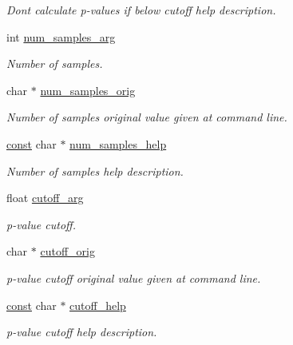 \begin{DoxyCompactItemize}
\begin{DoxyCompactList}\small\item\em Don\textquotesingle{}t calculate p-\/values if below cutoff help description. \end{DoxyCompactList}\item 
int \hyperlink{structgengetopt__args__info_ac62c13305dd12c4d426aeb82b6e4561b}{num\+\_\+samples\+\_\+arg}
\begin{DoxyCompactList}\small\item\em Number of samples. \end{DoxyCompactList}\item 
char $\ast$ \hyperlink{structgengetopt__args__info_a043409e12989cdbf8cd34fa47f8c6a4c}{num\+\_\+samples\+\_\+orig}
\begin{DoxyCompactList}\small\item\em Number of samples original value given at command line. \end{DoxyCompactList}\item 
\hyperlink{getopt_8c_a2c212835823e3c54a8ab6d95c652660e}{const} char $\ast$ \hyperlink{structgengetopt__args__info_a1c4039a0fea549c7db4b2c62482179f8}{num\+\_\+samples\+\_\+help}
\begin{DoxyCompactList}\small\item\em Number of samples help description. \end{DoxyCompactList}\item 
float \hyperlink{structgengetopt__args__info_a79efa24e1a3d614f474d323f147edf10}{cutoff\+\_\+arg}
\begin{DoxyCompactList}\small\item\em p-\/value cutoff. \end{DoxyCompactList}\item 
char $\ast$ \hyperlink{structgengetopt__args__info_ac1cc7e0fbe8552f19e4760b827349622}{cutoff\+\_\+orig}
\begin{DoxyCompactList}\small\item\em p-\/value cutoff original value given at command line. \end{DoxyCompactList}\item 
\hyperlink{getopt_8c_a2c212835823e3c54a8ab6d95c652660e}{const} char $\ast$ \hyperlink{structgengetopt__args__info_a46f7d71837544abf13c5972fc5e528b3}{cutoff\+\_\+help}
\begin{DoxyCompactList}\small\item\em p-\/value cutoff help description. \end{DoxyCompactList}\item 

\end{DoxyCompactItemize}
